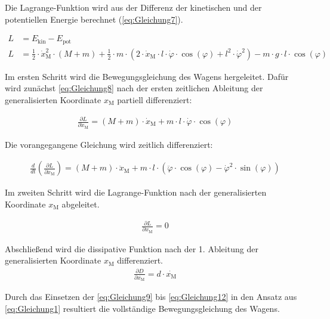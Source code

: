 \documentclass[
	pagesize,
	fontsize=12pt,
	paper=a4,
	oneside,
   reqno
]{scrartcl}
\begin{document}
Die Lagrange-Funktion wird aus der Differenz der kinetischen und der potentiellen Energie berechnet (\autoref{eq:Gleichung7}).

\begin{align} 
        L &= E_{\mathrm{kin}} - E_{\mathrm{pot}}  \label{eq:Gleichung7} \\ 
        L &= \frac{1}{2} \cdot \dot{x}_{\mathrm{M}}^2 \cdot (M + m) + \frac{1}{2} \cdot m \cdot \left( 2 \cdot \dot{x}_{\mathrm{M}} \cdot l \cdot \dot{\varphi} \cdot \cos({\varphi}) + l^2 \cdot \dot{\varphi}^2\right) - m \cdot g \cdot l \cdot \cos({\varphi}) \label{eq:Gleichung8}
\end{align}

Im ersten Schritt wird die Bewegungsgleichung des Wagens hergeleitet. Dafür wird zunächst \autoref{eq:Gleichung8} nach der ersten zeitlichen Ableitung der generalisierten Koordinate $x_{\mathrm{M}}$ partiell differenziert:

\begin{align}\label{eq:Gleichung9}
    \frac{\partial L}{\partial \dot{x}_{\mathrm{M}}} = (M + m) \cdot \dot{x}_{\mathrm{M}} + m \cdot l \cdot \dot{\varphi} \cdot \cos(\varphi)
\end{align}

Die vorangegangene Gleichung wird zeitlich differenziert:

\begin{align}\label{eq:Gleichung10}
    \frac{d}{dt}\left(\frac{\partial L}{\partial \dot{x}_{\mathrm{M}}}\right) = (M + m) \cdot \ddot{x}_{\mathrm{M}} + m \cdot l \cdot \left(\ddot{\varphi} \cdot \cos(\varphi) - \dot{\varphi}^2 \cdot \sin(\varphi) \right)
\end{align}

Im zweiten Schritt wird die Lagrange-Funktion nach der generalisierten Koordinate $x_{\mathrm{M}}$ abgeleitet.

\begin{align}\label{eq:Gleichung11}
    \frac{\partial L}{\partial x_{\mathrm{M}}} = 0
\end{align}

Abschließend wird die dissipative Funktion nach der 1. Ableitung der generalisierten Koordinate $x_{\mathrm{M}}$ differenziert.
\begin{align}\label{eq:Gleichung12}
    \frac{\partial D}{\partial \dot{x_{\mathrm{M}}}} = d \cdot \dot{x_{\mathrm{M}}}
\end{align}

Durch das Einsetzen der \autoref{eq:Gleichung9} bis \autoref{eq:Gleichung12} in den Ansatz aus \autoref{eq:Gleichung1} resultiert die vollständige Bewegungsgleichung des Wagens.
\end{document}
